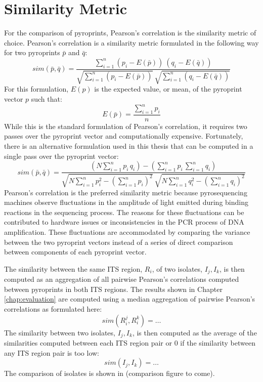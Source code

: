 \documentclass[12pt]{ucthesis}
\begin{document}
      \section{Similarity Metric}\label{sec:sim_metric}
      For the comparison of pyroprints, Pearson's correlation is the similarity
      metric of choice. Pearson's correlation is a similarity metric formulated
      in the following way for two pyroprints $\bar{p}$ and $\bar{q}$:
      $$
         sim(\bar{p},\bar{q}) =
         \frac{
            \sum_{i=1}^{n}{(p_i - E(\bar{p})) \: (q_i - E(\bar{q}))}
         }
         {
            \sqrt{\sum_{i=1}^{n}(p_i-E(\bar{p}))} \:
            \sqrt{\sum_{i=1}^{n}(q_i-E(\bar{q}))}
         }
      $$
      For this formulation, $E(p)$ is the expected value, or mean, of the
      pyroprint vector $p$ such that:
      $$E(\bar{p}) = \frac{\sum_{i=1}^{n}{p_i}}{n}$$
      While this is the standard formulation of Pearson's correlation, it
      requires two passes over the pyroprint vector and computationally
      expensive. Fortunately, there is an alternative formulation used in this
      thesis that can be computed in a single pass over the pyroprint vector:
      $$
         sim(\bar{p},\bar{q}) =
         \frac{
            (N\sum_{i=1}^{n}{p_i \, q_i}) -
            (\sum_{i=1}^{n}{p_i} \, \sum_{i=1}^{n}{q_i})
         }
         {
            \sqrt{N \sum_{i=1}^{n}{p_i^2} - (\sum_{i=1}^{n}{p_i})^2}
            \:
            \sqrt{N \sum_{i=1}^{n}{q_i^2} - (\sum_{i=1}^{n}{q_i})^2}
         }
      $$
      Pearson's correlation is the preferred similarity metric because
      pyrosequencing machines observe fluctuations in the amplitude of light
      emitted during binding reactions in the sequencing process. The reasons
      for these fluctuations can be contributed to hardware issues or
      inconsistencies in the PCR process of DNA amplification. These
      fluctuations are accommodated by comparing the variance between the two
      pyroprint vectors instead of a series of direct comparison between
      components of each pyroprint vector.

      The similarity between the same ITS region, $R_i$, of two isolates, $I_j,
      I_k$, is then computed as an aggregation of all pairwise Pearson's
      correlations computed between pyroprints in both ITS regions. The results
      shown in Chapter \ref{chap:evaluation} are computed using a median
      aggregation of pairwise Pearson's correlations as formulated here:
      $$
         sim(R_{i}^{j}, R_{i}^{k}) = \ldots
      $$
      The similarity between two isolates, $I_j, I_k$, is then computed as the
      average of the similarities computed between each ITS region pair or $0$
      if the similarity between any ITS region pair is too low:
      $$
         sim(I_j, I_k) = \ldots
      $$
      The comparison of isolates is shown in (comparison figure to come).
\end{document}
